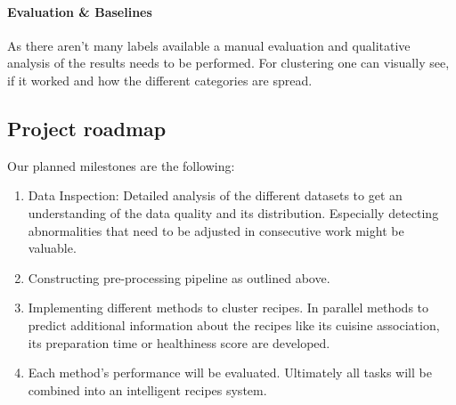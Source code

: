 \documentclass[
     12pt,         %
     a4paper,      %
     BCOR10mm,     %
     DIV14,        %
     ]{article}
\begin{document}
\paragraph{Evaluation \& Baselines} As there aren't many labels available a manual evaluation and qualitative analysis of the results needs to be performed. For clustering one can visually see, if it worked and how the different categories are spread.


\subsection{Project roadmap}

Our planned milestones are the following:

\begin{enumerate}
  \item Data Inspection: Detailed analysis of the different datasets to get an understanding of the data quality and its distribution. Especially detecting abnormalities that need to be adjusted in consecutive work might be valuable.
  \item Constructing pre-processing pipeline as outlined above.
  \item Implementing different methods to cluster recipes. In parallel methods to predict additional information about the recipes like its cuisine association, its preparation time or healthiness score are developed.
  \item Each method's performance will be evaluated. Ultimately all tasks will be combined into an intelligent recipes system.
\end{enumerate}




%
%
%





\end{document}
